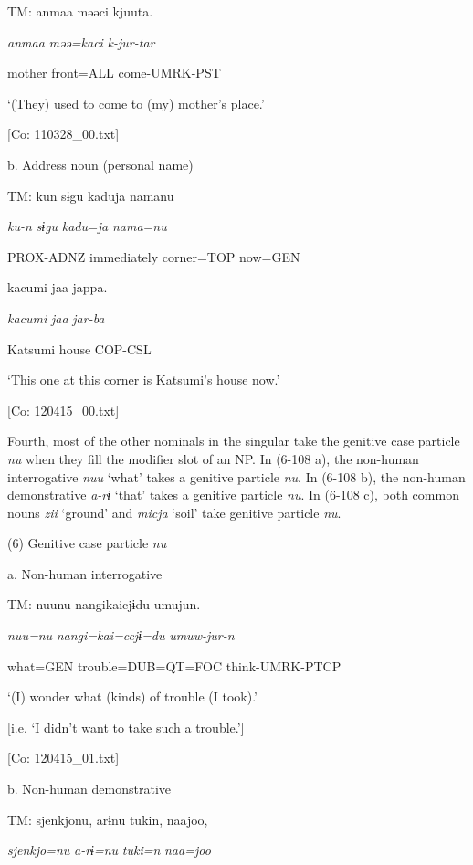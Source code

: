     TM:  anmaa  məəci  kjuuta.

      \textit{anmaa}  \textit{məə=kaci}  \textit{k-jur-tar}

      mother  front=ALL  come-UMRK-PST

      ‘(They) used to come to (my) mother’s place.’

      [Co: 110328\_00.txt]

  b.  Address noun (personal name)

    TM:  kun  sɨgu  kaduja  namanu

      \textit{ku-n}  \textit{sɨgu}  \textit{kadu=ja}  \textit{nama=nu}

      PROX-ADNZ  immediately  corner=TOP  now=GEN

      kacumi  jaa  jappa.

      \textit{kacumi}  \textit{jaa}  \textit{jar-ba}

      Katsumi  house  COP-CSL

      ‘This one at this corner is Katsumi’s house now.’

      [Co: 120415\_00.txt]

  Fourth, most of the other nominals in the singular take the genitive case particle \textit{nu} when they fill the modifier slot of an NP. In (6-108 a), the non-human interrogative \textit{nuu} ‘what’ takes a genitive particle \textit{nu}. In (6-108 b), the non-human demonstrative \textit{a-rɨ} ‘that’ takes a genitive particle \textit{nu}. In (6-108 c), both common nouns \textit{zii} ‘ground’ and \textit{micja} ‘soil’ take genitive particle \textit{nu}.

(6)  Genitive case particle \textit{nu}

  a.  Non-human interrogative

    TM:  nuunu  nangikaicjɨdu  umujun.

      \textit{nuu=nu}  \textit{nangi=kai=ccjɨ=du}  \textit{umuw-jur-n}

      what=GEN  trouble=DUB=QT=FOC  think-UMRK-PTCP

      ‘(I) wonder what (kinds) of trouble (I took).’

[i.e. ‘I didn’t want to take such a trouble.’]

      [Co: 120415\_01.txt]

  b.  Non-human demonstrative

    TM:  {\textbar}sjenkjo{\textbar}nu,  arɨnu  tukin,  naajoo,

      \textit{sjenkjo=nu}  \textit{a-rɨ=nu}  \textit{tuki=n}  \textit{naa=joo}

